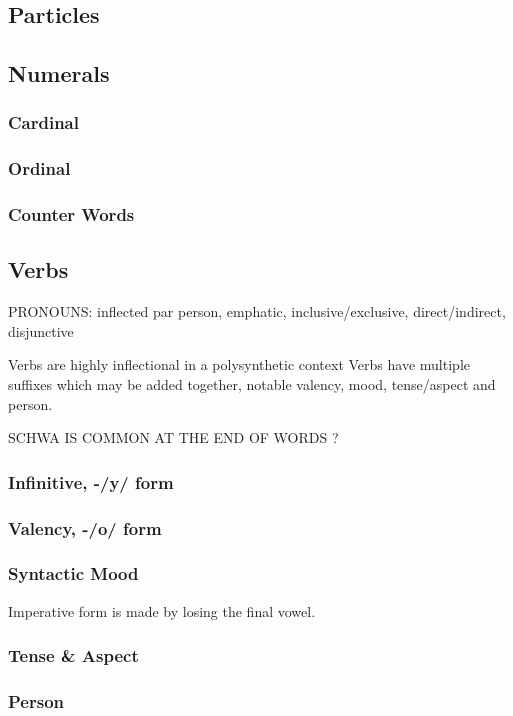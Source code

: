 \documentclass{article}
\begin{document}
    \subsection{Particles}
    \subsection{Numerals}
    \subsubsection{Cardinal}
    \subsubsection{Ordinal}
    \subsubsection{Counter Words}
    \subsection{Verbs}
    PRONOUNS: inflected par person, emphatic, inclusive/exclusive, direct/indirect, disjunctive


    Verbs are highly inflectional in a polysynthetic context
    Verbs have multiple suffixes which may be added together, notable valency, mood, tense/aspect and person.

    SCHWA IS COMMON AT THE END OF WORDS ?

    \subsubsection{Infinitive, -/y/ form}
    \subsubsection{Valency, -/o/ form}
    \subsubsection{Syntactic Mood}
        Imperative form is made by losing the final vowel.
    \subsubsection{Tense \& Aspect}
    \subsubsection{Person}
\end{document}
